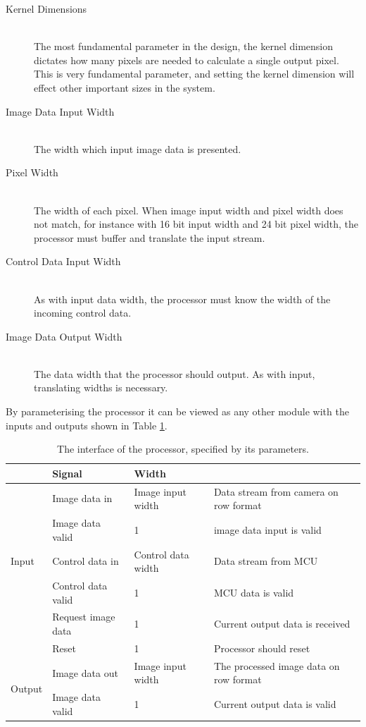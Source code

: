 \begin{description}
    \item[Kernel Dimensions] \hfill \\
        The most fundamental parameter in the design, the kernel dimension dictates how many pixels are needed to calculate a single output pixel.
        This is very fundamental parameter, and setting the kernel dimension will effect other important sizes in the system.
    \item[Image Data Input Width] \hfill \\
        The width which input image data is presented.
    \item[Pixel Width] \hfill \\
        The width of each pixel. When image input width and pixel width does not match, for instance with 16 bit input width and 24 bit pixel width, the processor must buffer and translate the input stream.
    \item[Control Data Input Width] \hfill \\
        As with input data width, the processor must know the width of the incoming control data.
    \item[Image Data Output Width] \hfill \\
        The data width that the processor should output. As with input, translating widths is necessary.
\end{description}

By parameterising the processor it can be viewed as any other module with the inputs and outputs shown in Table \ref{tbl:ConvolutionEngineIO}.

\begin{table}[h]
    \begin{tabular}{l | l | l | l }
        &   Signal & Width\\
        \hline
        \multirow{5}{*}{Input}
        &   Image data in           & Image input width     & Data stream from camera on row format
        \\
        &   Image data valid        & 1                     & image data input is valid
        \\
        &   Control data in         & Control data width    & Data stream from MCU
        \\
        &   Control data valid      & 1                     & MCU data is valid
        \\
        &   Request image data      & 1                     & Current output data is received
        \\
        &   Reset                   & 1                     & Processor should reset
        \\\hline
        \multirow{2}{*}{Output}
        &   Image data out          & Image input width     & The processed image data on row format\\
        &   Image data valid        & 1                     & Current output data is valid
    \end{tabular}
    \caption{The interface of the processor, specified by its parameters.}
    \label{tbl:ConvolutionEngineIO}
\end{table}

